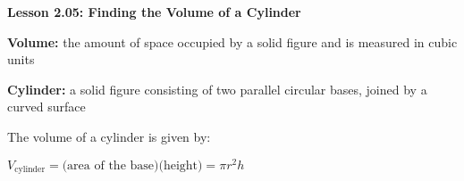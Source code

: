 \begin{center}
\textbf{Lesson 2.05: Finding the Volume of a Cylinder}
\end{center}

\vspace*{-1.5ex}

\textbf{Volume:} the amount of space occupied by a solid figure and is measured in cubic units

\textbf{Cylinder:} a solid figure consisting of two parallel circular bases, joined by a curved surface

The volume of a cylinder is given by:

{\centering $ V_{\text{cylinder}} = \text{(area of the base)(height)} = \pi r^{2}h $\par}


